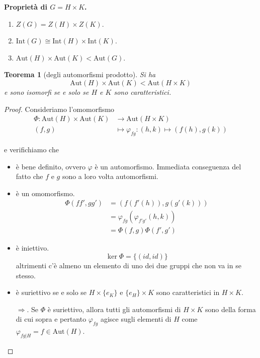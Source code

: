 \documentclass[a4paper]{article}
\newtheorem{theorem}{Teorema}[section]
\theoremstyle{remark}
\theoremstyle{definition}
\newcommand{\Aut}[1]{\mathrm{Aut}\left( #1 \right)}
\newcommand{\Int}[1]{\mathrm{Int}\left( #1 \right)}
\newcommand{\fun}[5]{
	\begin{align*}
	#1 \colon #2 &\to #3 \\
	#4 &\mapsto #5
	\end{align*}
}
\begin{document}
\begin{multicols}{2}
\textbf{Proprietà di $ G = H \times K $.}
\begin{enumerate}
	\item $ Z(G) = Z(H) \times Z(K) $.
	\item $ \Int{G} \cong \Int{H} \times \Int{K} $.
	\item $ \Aut{H} \times \Aut{K} < \Aut{G} $.
\end{enumerate}
\begin{theorem}[degli automorfismi prodotto]
	Si ha $$  \Aut{H} \times \Aut{K} < \Aut{H \times K}  $$ e sono isomorfi se e solo se $ H $ e $ K $ sono caratteristici.
\end{theorem}
\begin{proof}
	Consideriamo l'omomorfismo \fun{\Phi}{\Aut{H} \times \Aut{K}}{\Aut{H \times K}}{(f, g)}{\varphi_{fg}: (h, k) \mapsto \left(f(h), g(k)\right)}
	e verifichiamo che
	\begin{itemize}
		\item è bene definito, ovvero $ \varphi $ è un automorfismo. Immediata conseguenza del fatto che $ f $ e $ g $ sono a loro volta automorfismi.
		\item è un omomorfismo.  \begin{align*}
			\Phi(ff',gg') &= \left( f(f'(h)), g(g'(k)) \right)\\& = \varphi_{fg}(\varphi_{f'g'}(h, k)) \\&= \Phi(f, g)\Phi(f',g') 
		\end{align*}
		\item è iniettivo.
		\[ \ker\Phi = \{ (id, id) \} \]
		altrimenti c'è almeno un elemento di uno dei due gruppi che non va in se stesso.
		
		\item è suriettivo se e solo se $ H\times\{e_K\} $ e $ \{e_H\}\times K $ sono caratteristici in $ H \times K $.
		
		$ \Rightarrow $. Se $ \Phi $ è suriettivo, allora tutti gli automorfismi di $ H \times K $ sono della forma di cui sopra e pertanto $ \varphi_{fg} $ agisce sugli elementi di $ H $ come $ \varphi_{fg|H} = f \in \Aut{H} $.
		

\end{itemize}
\end{proof}
\end{multicols}
\end{document}
